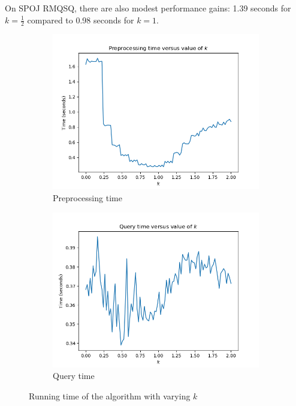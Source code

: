 \documentclass[11pt, oneside]{article}
\begin{document}
On SPOJ RMQSQ, there are also modest performance gains: 1.39 seconds for \( k = \frac{1}{2} \)
compared to 0.98 seconds for \( k = 1 \).

\begin{figure}[h!]
    \centering
    \begin{subfigure}[b]{0.4 \textwidth}
        \includegraphics[width=1.5\textwidth]{preprocessing}
        \caption{Preprocessing time}
    \end{subfigure}
    \hfill
    \begin{subfigure}[b]{0.4 \textwidth}
        \includegraphics[width=1.5\textwidth]{query}
        \caption{Query time}
    \end{subfigure}
    \caption{Running time of the algorithm with varying \( k \)}
\end{figure}
\end{document}
